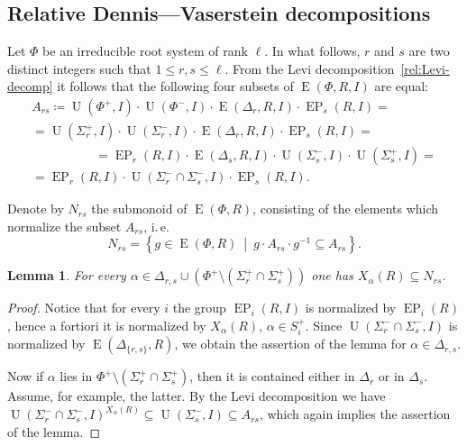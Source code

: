 \documentclass[oneside, 12pt]{amsart}
\theoremstyle{plain}
\numberwithin{equation}{section}
\newtheorem{lemma}{Lemma}
\numberwithin{lemma}{section}
\theoremstyle{definition}
\theoremstyle{remark}
\DeclareMathOperator{\E}{E}
\DeclareMathOperator{\EP}{EP}
\DeclareMathOperator{\U}{U}
\begin{document}
\subsection{Relative Dennis---Vaserstein decompositions}\label{sec:dennis-vaserstein}
Let $\Phi$ be an irreducible root system of rank $\ell$.
In what follows, $r$ and $s$ are two distinct integers such that $1 \leqslant r, s \leqslant \ell$.
From the Levi decomposition~\eqref{rel:Levi-decomp} it follows that the following four subsets of $\E(\Phi, R, I)$ are equal:
\begin{multline*}
A_{rs} \coloneqq \U(\Phi^+, I)\cdot \U(\Phi^-, I) \cdot \E(\Delta_r, R, I) \cdot \EP_s(R, I) = \\
= \U(\Sigma_r^+, I)\cdot \U(\Sigma^-_r, I) \cdot \E(\Delta_r, R, I) \cdot \EP_s(R, I) = \hspace{5em} \\
\hspace{5em} = \EP_r(R, I) \cdot \E(\Delta_s, R, I) \cdot \U(\Sigma_s^-, I)\cdot \U(\Sigma_s^+, I) = \\
= \EP_r(R, I) \cdot \U(\Sigma^-_r \cap \Sigma^-_s, I) \cdot \EP_s(R, I).
\end{multline*}

Denote by $N_{rs}$ the submonoid of $\E(\Phi, R)$, consisting of the elements which normalize the subset $A_{rs}$, i.\,e.
\[ N_{rs} = \left\{ g\in \E(\Phi, R)\ \middle|\ g \cdot A_{rs} \cdot g^{-1} \subseteq A_{rs} \right\}. \]

\begin{lemma}\label{lemma:dv-normal} 
For every $\alpha \in \Delta_{r, s} \cup (\Phi^+ \setminus (\Sigma^+_r \cap \Sigma^+_s))$ one has $X_\alpha(R) \subseteq N_{rs}$. \end{lemma}
\begin{proof}
Notice that for every $i$ the group $\EP_i(R, I)$ is normalized by $\EP_i(R)$, hence a fortiori it is normalized by $X_\alpha(R)$, $\alpha \in S_i^+$.
Since $\U(\Sigma_r^- \cap \Sigma_s^-, I)$ is normalized by $\E(\Delta_{\{r, s\}}, R)$, we obtain the assertion of the lemma for $\alpha \in \Delta_{r, s}$.

Now if $\alpha$ lies in $\Phi^+ \setminus (\Sigma_r^+ \cap \Sigma_s^+)$, then it is contained either in $\Delta_r$ or in $\Delta_s$.
Assume, for example, the latter. By the Levi decomposition we have $\U(\Sigma_r^- \cap \Sigma_s^-, I)^{X_\alpha(R)} \subseteq \U(\Sigma_s^-, I) \subseteq A_{rs}$,
which again implies the assertion of the lemma.
\end{proof}
\end{document}

